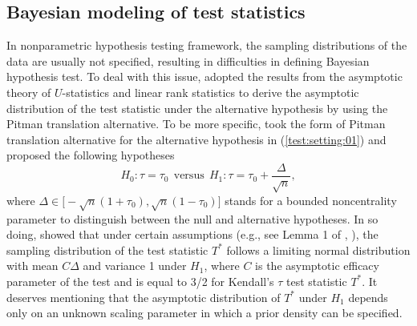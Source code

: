 \documentclass[11pt]{article}
\begin{document}
\subsection{Bayesian modeling of test statistics} \label{section:02:01}

In nonparametric hypothesis testing framework, the sampling distributions of the data are usually not specified, resulting in difficulties in defining  Bayesian hypothesis test. To deal with this issue, \cite{Yuan:John:2008}
adopted the results from the  asymptotic theory of $U$-statistics and linear rank statistics to derive the asymptotic distribution of the test statistic under the alternative hypothesis by using the Pitman translation alternative. To be more specific,  \cite{Yuan:John:2008} took the form of Pitman translation alternative for the alternative hypothesis in (\ref{test:setting:01}) and proposed the following hypotheses
\begin{equation} \label{old:pitman}
H_0: \tau = \tau_0 \ \ \mathrm{versus} \ \ H_1: \tau = \tau_0 +  \frac{\Delta}{\sqrt{n}},
\end{equation}
where $\Delta \in \bigl[-\sqrt{n}(1 + \tau_0), \sqrt{n}(1  - \tau_0)\bigr]$ stands for a bounded noncentrality parameter to distinguish between the null and alternative hypotheses. In so doing, \cite{Yuan:John:2008} showed that under certain assumptions (e.g., see Lemma 1 of  \citeauthor{Yuan:John:2008},  \citeyear{Yuan:John:2008}), the sampling distribution of the test statistic $T^\ast$ follows a limiting normal distribution with mean $C\Delta$ and variance 1 under $H_1$,  where $C$ is the asymptotic efficacy parameter of the test and is equal to 3/2 for Kendall's $\tau$ test statistic $T^\ast$. It deserves mentioning that the asymptotic distribution of $T^\ast$ under $H_1$ depends only on an unknown scaling parameter in which a prior density can be specified.
\end{document}
